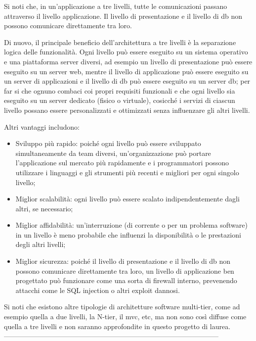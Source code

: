 Si noti che, in un'applicazione a tre livelli, tutte le comunicazioni passano attraverso il livello applicazione. Il livello di presentazione e il livello di \acrlong{db} non possono comunicare direttamente tra loro.

Di nuovo, il principale beneficio dell'architettura a tre livelli è la separazione logica delle funzionalità. Ogni livello può essere eseguito su un sistema operativo e una piattaforma server diversi, ad esempio un livello di presentazione può essere eseguito su un server web, mentre il livello di applicazione può essere eseguito su un server di applicazioni e il livello di \acrlong{db} può essere eseguito su un server \acrlong{db}; per far si che ognuno combaci coi propri requisiti funzionali e che ogni livello sia eseguito su un server dedicato (fisico o virtuale), cosicché i servizi di ciascun livello possano essere personalizzati e ottimizzati senza influenzare gli altri livelli.

Altri vantaggi includono:
\begin{itemize}
\item Sviluppo più rapido: poiché ogni livello può essere sviluppato simultaneamente da team diversi, un'organizzazione può portare l'applicazione sul mercato più rapidamente e i programmatori possono utilizzare i linguaggi e gli strumenti più recenti e migliori per ogni singolo livello;
\item Miglior scalabilità: ogni livello può essere scalato indipendentemente dagli altri, se necessario;
\item Miglior affidabilità: un'interruzione (di corrente o per un problema software) in un livello è meno probabile che influenzi la disponibilità o le prestazioni degli altri livelli;
\item Miglior sicurezza: poiché il livello di presentazione e il livello di \acrlong{db} non possono comunicare direttamente tra loro, un livello di applicazione ben progettato può funzionare come una sorta di firewall interno, prevenendo attacchi come le SQL injection o altri exploit dannosi.
\end{itemize}


Si noti che esistono altre tipologie di architetture software multi-tier, come ad esempio quella a due livelli, la N-tier, il \acrshort{mvc}, etc, ma non sono così diffuse come quella a tre livelli e non saranno approfondite in questo progetto di laurea.\newline
---------------------------------------------------------------------------------------------


